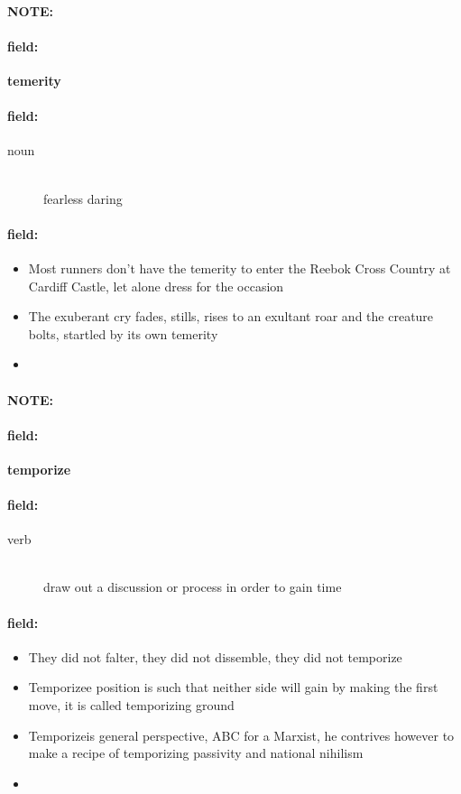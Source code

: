 \documentclass[12pt]{article}
\newenvironment{note}{\paragraph{NOTE:}}{}
\newenvironment{field}{\paragraph{field:}}{}
\begin{document}
\begin{note}
\begin{field}
\textbf{\large temerity}
\end{field}


\begin{field}
\begin{description}
\item[noun] \hfill \\ 
fearless daring

\end{description}
\end{field}

\begin{field}
\begin{itemize}
\item Most runners don't have the temerity to enter the Reebok Cross Country at Cardiff Castle, let alone dress for the occasion
\item The exuberant cry fades, stills, rises to an exultant roar and the creature bolts, startled by its own temerity
\item 
\end{itemize}
\end{field}
\end{note}
\begin{note}
\begin{field}
\textbf{\large temporize}
\end{field}


\begin{field}
\begin{description}
\item[verb] \hfill \\ 
draw out a discussion or process in order to gain time

\end{description}
\end{field}

\begin{field}
\begin{itemize}
\item They did not falter, they did not dissemble, they did not temporize
\item Temporizee position is such that neither side will gain by making the first move, it is called temporizing ground
\item Temporizeis general perspective, ABC for a Marxist, he contrives however to make a recipe of temporizing passivity and national nihilism
\item 
\end{itemize}
\end{field}
\end{note}
\end{document}
